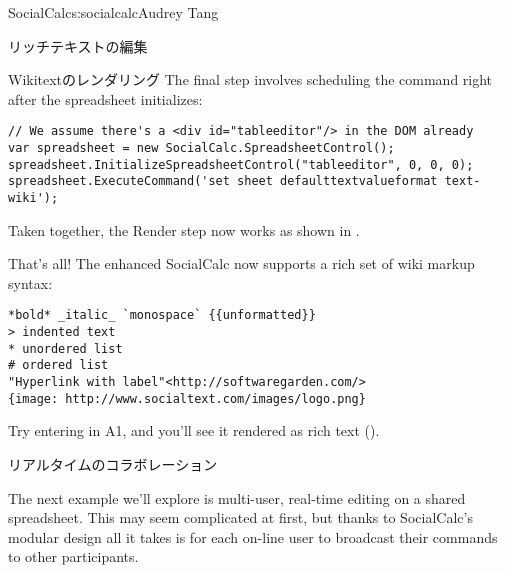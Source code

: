 \begin{aosachapter}{SocialCalc}{s:socialcalc}{Audrey Tang}
\begin{aosasect1}{リッチテキストの編集}
\begin{aosasect2}{Wikitextのレンダリング}
\pagebreak 
\noindent The final step involves scheduling the  command right after the
spreadsheet initializes:


\begin{verbatim}
// We assume there's a <div id="tableeditor"/> in the DOM already
var spreadsheet = new SocialCalc.SpreadsheetControl();
spreadsheet.InitializeSpreadsheetControl("tableeditor", 0, 0, 0);
spreadsheet.ExecuteCommand('set sheet defaulttextvalueformat text-wiki');
\end{verbatim}

\noindent Taken together, the Render step now works as shown in
.


That's all!  The enhanced SocialCalc now supports a rich set of wiki
markup syntax:

\begin{verbatim}
*bold* _italic_ `monospace` {{unformatted}}
> indented text
* unordered list
# ordered list
"Hyperlink with label"<http://softwaregarden.com/>
{image: http://www.socialtext.com/images/logo.png}
\end{verbatim}

\noindent Try entering  in A1, and you'll
see it rendered as rich text ().


\end{aosasect2}

\end{aosasect1}


\begin{aosasect1}{リアルタイムのコラボレーション}

The next example we'll explore is multi-user, real-time editing on a
shared spreadsheet.  This may seem complicated at first, but thanks to
SocialCalc's modular design all it takes is for each on-line user to
broadcast their commands to other participants.


\end{aosasect1}
\end{aosachapter}
